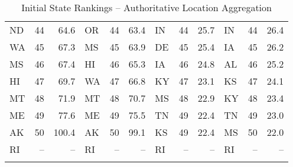 \begin{longtable}{lrr|lrr||lrr|lrr}
        ND &   44 &   64.6 &            OR &   44 &  63.4 &             IN &   44 &   25.7 &            IN &   44 &   26.4 \\
        WA &   45 &   67.3 &            MS &   45 &  63.9 &             DE &   45 &   25.4 &            IA &   45 &   26.2 \\
        MS &   46 &   67.4 &            HI &   46 &  65.3 &             IA &   46 &   24.8 &            AL &   46 &   25.2 \\
        HI &   47 &   69.7 &            WA &   47 &  66.8 &             KY &   47 &   23.1 &            KS &   47 &   24.1 \\
        MT &   48 &   71.9 &            MT &   48 &  70.7 &             MS &   48 &   22.9 &            KY &   48 &   23.4 \\
        ME &   49 &   77.6 &            ME &   49 &  75.5 &             TN &   49 &   22.4 &            TN &   49 &   23.0 \\
        AK &   50 &  100.4 &            AK &   50 &  99.1 &             KS &   49 &   22.4 &            MS &   50 &   22.0 \\
        RI &   -- &     -- &            RI &   -- &    -- &             RI &   -- &     -- &            RI &   -- &     -- \\
        
        \caption{Initial State Rankings -- Authoritative Location Aggregation}
        \label{tab:dns_auth_initial_state_rankings}
\end{longtable}